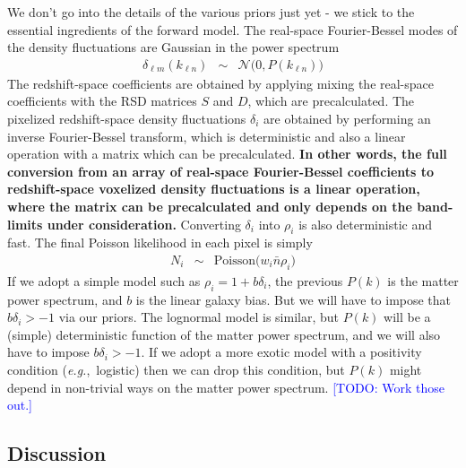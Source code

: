 \documentclass{aastex6}
\newcommand{\eg}{{\textit{e.g.},~}}
\newcommand{\eqn}[1]{\begin{eqnarray}#1\end{eqnarray}}
\newcommand{\todo}[1]{\textcolor{blue}{[TODO: #1]}}
\begin{document}
We don't go into the details of the various priors just yet - we stick to the essential ingredients of the forward model.
The real-space Fourier-Bessel modes of the density fluctuations are Gaussian in the power spectrum
\eqn{
	\delta_{\ell m}(k_{\ell n})	&\sim& \mathcal{N}\bigl(0, P(k_{\ell n})\bigr)
	}
The redshift-space coefficients are obtained by applying mixing the real-space coefficients with the RSD matrices $S$ and $D$, which are precalculated.
The pixelized redshift-space density fluctuations $\delta_i$ are obtained by performing an inverse Fourier-Bessel transform, which is deterministic and also a linear operation with a matrix which can be precalculated.
\textbf{In other words, the full conversion from an array of real-space Fourier-Bessel coefficients to redshift-space voxelized density fluctuations is a linear operation, where the matrix can be precalculated and only depends on the band-limits under consideration.}
Converting $\delta_i$ into $\rho_i$ is also deterministic and fast. 
The final Poisson likelihood in each pixel is simply
\eqn{
	N_i &\sim& \mathrm{Poisson}\bigl( w_i \bar{n} \rho_i  \bigr)
}
If we adopt a simple model such as $\rho_i = 1 + b \delta_i$, the previous $P(k)$ is the matter power spectrum, and $b$ is the linear galaxy bias. 
But we will have to impose that $b \delta_i > -1$ via our priors.
The lognormal model is similar, but $P(k)$ will be a (simple) deterministic function of the matter power spectrum, and we will also have to impose $b \delta_i > -1$.
If we adopt a more exotic model with a positivity condition (\eg logistic) then we can drop this condition, but $P(k)$  might depend in non-trivial ways on the matter power spectrum.
\todo{Work those out.}


\subsection{Discussion}
\end{document}
